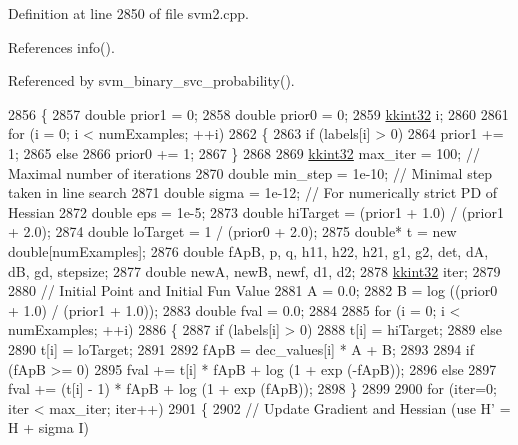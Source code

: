 Definition at line 2850 of file svm2.\+cpp.



References info().



Referenced by svm\+\_\+binary\+\_\+svc\+\_\+probability().


\begin{DoxyCode}
2856 \{
2857   \textcolor{keywordtype}{double}  prior1 = 0;
2858   \textcolor{keywordtype}{double}  prior0 = 0;
2859   \hyperlink{namespace_k_k_b_a8fa4952cc84fda1de4bec1fbdd8d5b1b}{kkint32} i;
2860 
2861   \textcolor{keywordflow}{for} (i = 0;  i < numExamples;  ++i)
2862   \{
2863     \textcolor{keywordflow}{if}  (labels[i] > 0)
2864       prior1 += 1;
2865     \textcolor{keywordflow}{else} 
2866       prior0 += 1;
2867   \}
2868 
2869   \hyperlink{namespace_k_k_b_a8fa4952cc84fda1de4bec1fbdd8d5b1b}{kkint32} max\_iter  = 100;    \textcolor{comment}{// Maximal number of iterations}
2870   \textcolor{keywordtype}{double}  min\_step  = 1e-10;  \textcolor{comment}{// Minimal step taken in line search}
2871   \textcolor{keywordtype}{double}  sigma     = 1e-12;  \textcolor{comment}{// For numerically strict PD of Hessian}
2872   \textcolor{keywordtype}{double}  eps       = 1e-5;
2873   \textcolor{keywordtype}{double}  hiTarget  = (prior1 + 1.0) / (prior1 + 2.0);
2874   \textcolor{keywordtype}{double}  loTarget  =  1 / (prior0 + 2.0);
2875   \textcolor{keywordtype}{double}* t = \textcolor{keyword}{new} \textcolor{keywordtype}{double}[numExamples];
2876   \textcolor{keywordtype}{double}  fApB, p, q, h11, h22, h21, g1, g2, det, dA, dB, gd, stepsize;
2877   \textcolor{keywordtype}{double}  newA, newB, newf, d1, d2;
2878   \hyperlink{namespace_k_k_b_a8fa4952cc84fda1de4bec1fbdd8d5b1b}{kkint32}   iter; 
2879   
2880   \textcolor{comment}{// Initial Point and Initial Fun Value}
2881   A = 0.0; 
2882   B = log ((prior0 + 1.0) / (prior1 + 1.0));
2883   \textcolor{keywordtype}{double}  fval = 0.0;
2884 
2885   \textcolor{keywordflow}{for}  (i = 0;  i < numExamples;  ++i)
2886   \{
2887     \textcolor{keywordflow}{if}  (labels[i] > 0) 
2888       t[i] = hiTarget;
2889     \textcolor{keywordflow}{else} 
2890       t[i] = loTarget;
2891 
2892     fApB = dec\_values[i] * A + B;
2893     
2894     \textcolor{keywordflow}{if} (fApB >= 0)
2895       fval += t[i] * fApB + log (1 + exp (-fApB));
2896     \textcolor{keywordflow}{else}
2897       fval += (t[i] - 1) * fApB + log (1 + exp (fApB));
2898   \}
2899 
2900   \textcolor{keywordflow}{for}  (iter=0;  iter < max\_iter;  iter++)
2901   \{
2902     \textcolor{comment}{// Update Gradient and Hessian (use H' = H + sigma I)}

\end{DoxyCode}
